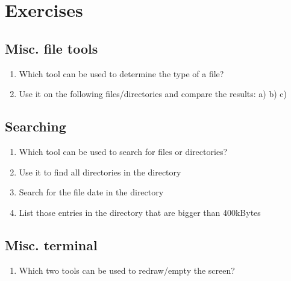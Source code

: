 \documentclass[letterpaper,10pt,english]{sphinxmanual}
\begin{document}
\chapter{Exercises}
\label{exercises_beginner:exercises}\label{exercises_beginner::doc}

\section{Misc. file tools}
\label{exercises_beginner:misc-file-tools}\begin{enumerate}
\item {} 
Which tool can be used to determine the type of a file?

\item {} 
Use it on the following files/directories and compare the results:
a) 
b) \code{\textasciitilde{}}
c) 

\end{enumerate}


\section{Searching}
\label{exercises_beginner:searching}\begin{enumerate}
\item {} 
Which tool can be used to search for files or directories?

\item {} 
Use it to find all directories in the  directory

\item {} 
Search for the file date in the  directory

\item {} 
List those entries in the directory  that are bigger than 400kBytes

\end{enumerate}


\section{Misc. terminal}
\label{exercises_beginner:misc-terminal}\begin{enumerate}
\item {} 
Which two tools can be used to redraw/empty the screen?

\end{enumerate}
\end{document}
